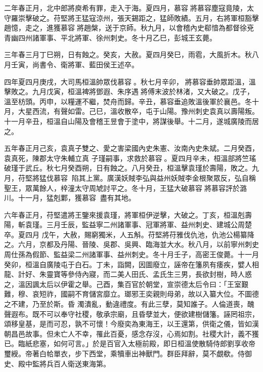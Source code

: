 \begin{pinyinscope}
 二年春正月，北中郎將庾希有罪，走入于海。夏四月，慕容將慕容塵寇竟陵，太守羅崇擊破之。苻堅將王猛寇涼州，張天錫距之，猛師敗績。五月，右將軍桓豁擊趙憶，走之，進獲慕容將趙槃，送于京師。秋九月，以會稽內史郗愔為都督徐兗青幽四州諸軍事、平北將軍、徐州刺史。冬十月乙巳，彭城王玄薨。



 三年春三月丁巳朔，日有蝕之。癸亥，大赦。夏四月癸巳，雨雹，大風折木。秋八月壬寅，尚書令、衛將軍、藍田侯王述卒。



 四年夏四月庚戌，大司馬桓溫帥眾伐慕容。秋七月辛卯，將慕容垂帥眾距溫，溫擊敗之。九月戊寅，桓溫裨將鄧遐、朱序遇將傅末波於林渚，又大破之。戊子，溫至枋頭。丙申，以糧運不繼，焚舟而歸。辛丑，慕容垂追敗溫後軍於襄邑。冬十月，大星西流，有聲如雷。己巳，溫收散卒，屯于山陽。豫州刺史袁真以壽陽叛。十一月辛丑，桓溫自山陽及會稽王昱會于塗中，將謀後舉。十二月，遂城廣陵而居之。



 五年春正月己亥，袁真子雙之、愛之害梁國內史朱憲、汝南內史朱斌。二月癸酉，袁真死，陳郡太守朱輔立真
 子瑾嗣事，求救於慕容。夏四月辛未，桓溫部將竺瑤破瑾于武丘。秋七月癸酉朔，日有蝕之。八月癸丑，桓溫擊袁瑾於壽陽，敗之。九月，苻堅將猛伐慕容，陷其上黨。廣漢妖賊李弘與益州妖賊李金根聚眾反，弘自稱聖王，眾萬餘人，梓潼太守周虓討平之。冬十月，王猛大破慕容將慕容評於潞川。十一月，猛剋鄴，獲慕容，盡有其地。



 六年春正月，苻堅遣將王鑒來援袁瑾，將軍桓伊逆擊，大破之。丁亥，桓溫剋壽陽，斬袁瑾。三月壬辰，監益寧二州諸軍事、冠軍將軍、益州刺史、建城公周楚卒。夏四月
 戊午，大赦，賜窮獨米，人五斛。苻堅將苻雅伐仇池，仇池公楊纂降之。六月，京都及丹陽、晉陵、吳郡、吳興、臨海並大水。秋八月，以前寧州刺史周仕孫為假節、監益梁二州諸軍事、益州刺史。冬十月壬子，高密王俊薨。十一月癸卯，桓溫自廣陵屯于白石。丁未，詣闕，因圖廢立，誣帝在籓夙有痿疾，嬖人相龍、計好、朱靈寶等參侍內寢，而二美人田氏、孟氏生三男，長欲封樹，時人惑之，溫因諷太后以伊霍之舉。己酉，集百官於朝堂，宣崇德太后令曰：「王室艱難，穆、哀短祚，國嗣不育儲宮靡立。瑯邪王奕親則母弟，故以入纂大位。不圖德之不建，乃至於斯。昏
 濁潰亂，動違禮度。有此三孽，莫知誰子。人倫道喪，醜聲遐布。既不可以奉守社稷，敬承宗廟，且昏孽並大，便欲建樹儲籓。誣罔祖宗，頌移皇基，是而可忍，孰不可懷！今廢奕為東海王，以王還第，供衛之儀，皆如漢朝昌邑故事。但未亡人不幸，罹此百憂，感念存沒，心焉如割。社稷大計，義不獲已。臨紙悲塞，如何可言。」於是百官入太極前殿，即日桓溫使散騎侍郎劉享收帝璽綬。帝著白帢單衣，步下西堂，乘犢車出神獸門。群臣拜辭，莫不覷欷。侍御史、殿中監將兵百人衛送東海第。




\end{pinyinscope}
